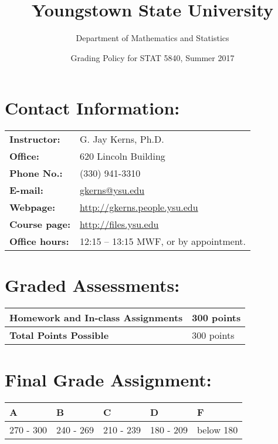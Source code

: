 \documentclass[11pt]{article}
\author{Department of Mathematics and Statistics}
\date{Grading Policy for STAT 5840, Summer 2017}
\title{\textbf{Youngstown State University}}
\begin{document}
\maketitle

\section*{Contact Information:}
\label{sec:orgheadline1}
\begin{center}
\begin{tabular}{l|l}
\hline
\textbf{Instructor:} & G. Jay Kerns, Ph.D.\\
\textbf{Office:} & 620 Lincoln Building\\
\textbf{Phone No.:} & (330) 941-3310\\
\textbf{E-mail:} & \href{mailto:gkerns@ysu.edu}{gkerns@ysu.edu}\\
\textbf{Webpage:} & \url{http://gkerns.people.ysu.edu}\\
\textbf{Course page:} & \url{http://files.ysu.edu}\\
\textbf{Office hours:} & 12:15 – 13:15 MWF, or by appointment.\\
\hline
\end{tabular}
\end{center}


\section*{Graded Assessments:}
\label{sec:orgheadline2}
\begin{center}
\begin{tabular}{l|l}
\hline
Homework and In-class Assignments & 300 points\\
\hline
\textbf{Total Points Possible} & 300 points\\
\hline
\end{tabular}
\end{center}

\section*{Final Grade Assignment:}
\label{sec:orgheadline3}
\begin{center}
\begin{tabular}{lllll}
\hline
A & B & C & D & F\\
\hline
270 - 300 & 240 - 269 & 210 - 239 & 180 - 209 & below 180\\
\hline
\end{tabular}
\end{center}
\end{document}
